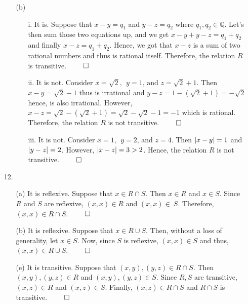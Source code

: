 \documentclass[12pt, a4paper]{article}
\newcommand{\rats}{\mathbb{Q}}
\DeclarePairedDelimiter\abs{\lvert}{\rvert}
\begin{document}
\begin{itemize}
\begin{itemize}
\item[(b)]
\begin{itemize}
\item[i.]
It is. Suppose that $x - y = q_1$ and $y - z = q_2$ where $q_1, q_2 \in \rats$.
Let's then sum those two equations up, and we get $x - y + y - z = q_1 + q_ 2$
and finally $x - z = q_1 + q_2$. Hence, we got that $x - z$ is a sum of two rational
numbers and thus is rational itself. Therefore, the relation $R$ is transitive.
$\qed$

\item[]

\item[ii.]
It is not. Consider $x = \sqrt{2}, \ \ y = 1 \mbox{, and } z = \sqrt{2} + 1$.
Then $x - y = \sqrt{2} - 1$ thus is irrational and $y - z = 1 - (\sqrt{2} + 1) = -\sqrt{2}$
hence, is also irrational. However, $x - z = \sqrt{2} - (\sqrt{2} + 1) = \sqrt{2} - \sqrt{2} - 1 = -1$
which is rational. Therefore, the relation $R$ is not transitive.
$\qed$

\item[]

\item[iii.]
It is not. Consider $x = 1, \ \ y = 2 \mbox{, and } z = 4$. Then $\abs{x - y} = 1$
and $\abs{y - z} = 2$. However, $\abs{x - z} = 3 > 2$. Hence, the relation $R$ is not transitive.
$\qed$
\end{itemize}
\end{itemize}

\item[]
\item[]

\item[12.]
\begin{itemize}
\item[(a)]
It is reflexive. Suppose that $x \in R \cap S$. Then $x \in R$ and $x \in S$. Since $R$ and $S$
are reflexive, $(x, x) \in R$ and $(x, x) \in \ S$. Therefore, $(x,x) \in R \cap S$.
$\qed$

\item[]

\item[(b)]
It is reflexive. Suppose that $x \in R \cup S$. Then, without a loss of generality, let $x \in S$.
Now, since $S$ is reflexive, $(x, x) \in S$ and thus, $(x, x) \in R \cup S$.
$\qed$

\item[]

\item[(e)]
It is transitive. Suppose that $(x, y), (y, z) \in R \cap S$. Then $(x, y), (y, z) \in R$
and $(x, y), (y, z) \in S$. Since $R, S$ are transitive, $(x, z) \in R$ and $(x, z) \in S$.
Finally, $(x, z) \in R \cap S$ and $R \cap S$ is transitive.
$\qed$


\end{itemize}
\end{itemize}
\end{document}

